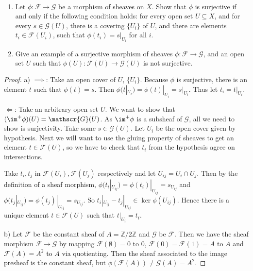 \begin{exercise}%
	~
	\begin{enumerate}
		\item Let $\phi :\mathscr{F}\to \mathscr{G} $ be a morphism of sheaves on $X $. Show that $\phi  $ is surjective if and only if the following condition holds: for every open set $U \subseteq X $, and for every $s \in \mathscr{G}(U) $, there is a covering $\{U_i\}   $ of $U $, and there are elements $t_i \in \mathscr{F}(U_i) $, such that $\phi (t_i) = s|_{U_i} $ for all $i $.
		\item Give an example of a surjective morphism of sheaves $\phi : \mathscr{F}\to \mathscr{G} $, and an open set $U $ such that $\phi (U): \mathscr{F}(U) \to \mathscr{G}(U) $ is not surjective.
	\end{enumerate}
\end{exercise}
\begin{proof}
	a) $\implies $: Take an open cover of $U $, $\{U_i\}   $.
	Because $\phi  $ is surjective, there is an element $t $ such that $\phi (t) = s $.
	Then $\phi (t|_{U_i}) = \phi(t)|_{U_i} = s|_{U_i} $.
	Thus let $t_i = t|_{U_i} $.

	$\Leftarrow $: Take an arbitrary open set $U $.
	We want to show that $(\im^+ \phi)(U) = \mathscr{G}(U) $.
	As $\im^+ \phi $ is a subsheaf of $\mathscr{G} $, all we need to show is surjectivity.
	Take some $s \in \mathscr{G}(U) $.
	Let $U_i $ be the open cover given by hypothesis.
	Next we will want to use the gluing property of sheaves to get an element $t \in \mathscr{F}(U) $, so we have to check that $t_i $ from the hypothesis agree on intersections.

	Take $t_i,t_j $ in $\mathscr{F}(U_i),\mathscr{F}(U_j) $ respectively and let $U_{ij} = U_i \cap U_j $.
	Then by the definition of a sheaf morphism, $\phi(t_i|_{U_{ij}}) = \phi(t_i)|_{U_{ij}} = s_{U_{ij}} $ and $\phi(t_j|_{U_{ij}}) = \phi(t_j)|_{U_{ij}} = s_{U_{ij}}$.
	So $t_i|_{U_{ij}}-t_{j}|_{U_{ij}} \in \ker \phi(U_{ij}) $.
	Hence there is a unique element $t\in \mathscr{F}(U)$ such that $t|_{U_i} = t_i $.

	b) Let $\mathscr{F} $ be the constant sheaf of $A = \mathbb{Z} / 2\mathbb{Z} $ and $\mathscr{G} $ be $\mathscr{F} $.
	Then we have the sheaf morphism $\mathscr{F} \to \mathscr{G} $ by mapping $\mathscr{F}(\emptyset) = 0$ to 0, $\mathscr{F}(0)= \mathscr{F}(1) = A$ to $A $ and $\mathscr{F}(A) = A^2 $ to $A $ via quotienting.
	Then the sheaf associated to the image presheaf is the constant sheaf, but $\phi(\mathscr{F}(A)) \ne \mathscr{G}(A) = A^2$.
\end{proof}

